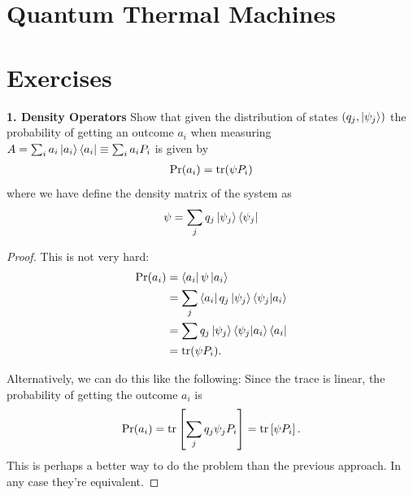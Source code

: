\documentclass{book}
\theoremstyle{definition}
\newcommand{\nn}{\nonumber}
\newcommand{\lb}{\left[}
\newcommand{\rb}{\right]}
\begin{document}
\newpage
\section{Quantum Thermal Machines}




\newpage


\section{Exercises}

\noindent \textbf{1. Density Operators} Show that given the distribution of states $(q_j, \ket{\psi_j})$ the probability of getting an outcome $a_i$ when measuring $A = \sum_i a_i \ket{a_i}\bra{a_i} \equiv \sum_i a_i P_i$ is given by
\begin{align}
\Pr(a_i) = \tr(\psi P_i)
\end{align} 
where we have define the density matrix of the system as
\begin{align}
\psi = \sum_j q_j \ket{\psi_j}\bra{\psi_j}
\end{align}


\begin{proof}
	This is not very hard: 
	\begin{align}
	\Pr(a_i) &= \bra{a_i} \psi \ket{a_i}\nn\\
	&= \sum_j \bra{a_i} q_j \ket{\psi_j}\bra{\psi_j}\ket{a_i}\nn\\
	&= \sum q_j \ket{\psi_j}\bra{\psi_j}\ket{a_i}\bra{a_i}\nn\\
	&= \tr(\psi P_i).
	\end{align}


Alternatively, we can do this like the following: Since the trace is linear, the probability of getting the outcome $a_i$ is 
\begin{align}
\Pr(a_i) = \tr\lb \sum_j q_j \psi_j P_i \rb = \tr\lb \psi P_i \rb.
\end{align}
This is perhaps a better way to do the problem than the previous approach. In any case they're equivalent. 
\end{proof}
\end{document}
